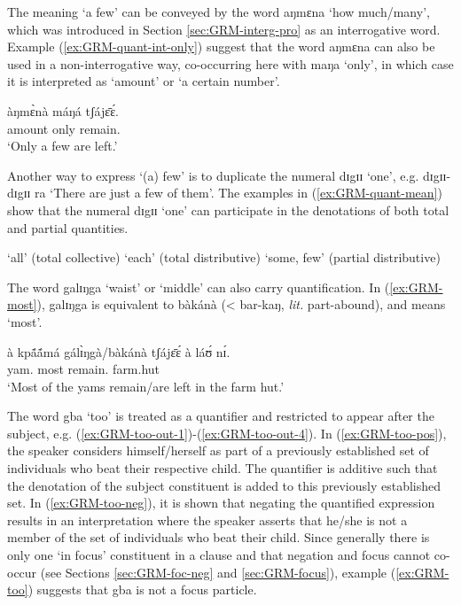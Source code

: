 \begin{exe}
\begin{exe}
\begin{exe}
{\begin{exe}
\begin{exe}
\begin{exe}
\begin{exe}
\begin{exe}
\begin{exe}
\begin{exe}

The meaning `a few' can be conveyed by  the word {\sls aŋmɛna} `how
much/many', which was introduced in Section \ref{sec:GRM-interg-pro} as an
interrogative
word. Example  
(\ref{ex:GRM-quant-int-only}) suggest that the word {\sls aŋmɛna} can also be
used in a non-interrogative way,  co-occurring here with {\sls maŋa} `only',  in
which case it is interpreted  as `amount' or `a certain number'.


\begin{exe}
 \ex\label{ex:GRM-quant-int-only}
\gll àŋmɛ̀nà máŋá tʃájɛ̄ɛ́.\\
   amount only remain.{\pfv}\\
\glt `Only a few are left.'
\z

Another way to express `(a) few'  is to duplicate the numeral {\sls dɪgɪɪ} 
`one',
e.g.
{\sls dɪgɪɪ-dɪgɪɪ ra} `There are just a few of them'.  The  examples in 
(\ref{ex:GRM-quant-mean}) show that the numeral {\sls dɪgɪɪ} `one' can
participate in the denotations of both total and partial quantities. 

\ea\label{ex:GRM-quant-mean}

  {\rm `all' (total collective)}
  {\rm `each' (total distributive)}
  {\rm `some, few' (partial distributive)}
 
\z 
 \z

The word {\sls galɪŋga} `waist' or `middle'  can also carry quantification. In
(\ref{ex:GRM-most}),  {\sls galɪŋga} is equivalent to {\sls bàkánà} (< {\sls 
bar-kaŋ},
{\it lit.} part-abound),  and means `most'.

\begin{exe}
 \ex\label{ex:GRM-most}
\gll   à kpã́ã́má  gálɪ̀ŋgà/bàkánà tʃájɛ̄ɛ́ à láʊ́ nɪ́.\\
{\art} yam.{\pl} most remain.{\pfv} {\art} farm.hut {\postp}\\
\glt  `Most of the yams remain/are left in the farm hut.'
\z

The word {\sls gba} `too' is treated as a quantifier and restricted to appear
after the subject, e.g. (\ref{ex:GRM-too-out-1})-(\ref{ex:GRM-too-out-4}). In
(\ref{ex:GRM-too-pos}), the speaker  considers himself/herself  as part of a
previously established set of individuals who beat their respective child. The
quantifier is additive such that  the denotation of the subject constituent is
added to this previously established set.  In (\ref{ex:GRM-too-neg}), it is
shown that negating the quantified expression results in an interpretation where
the speaker asserts that he/she is not a member of the set of individuals who
beat their child. Since generally there is only one `in focus' constituent in a
clause and that negation and focus cannot co-occur (see Sections
\ref{sec:GRM-foc-neg} and  \ref{sec:GRM-focus}), example (\ref{ex:GRM-too})
suggests that {\sls gba} is not a focus particle.



\end{exe}
\end{exe}
\end{exe}
\end{exe}
\end{exe}
\end{exe}
\end{exe}
\end{exe}
\end{exe}}
\end{exe}
\end{exe}
\end{exe}
